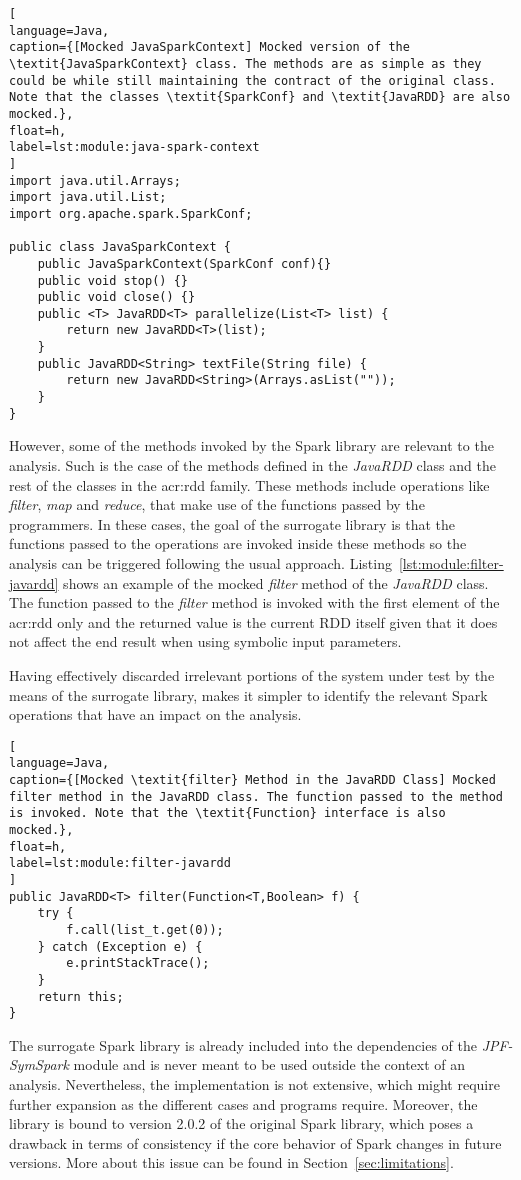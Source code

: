 \begin{lstlisting}[
language=Java,
caption={[Mocked JavaSparkContext] Mocked version of the \textit{JavaSparkContext} class. The methods are as simple as they could be while still maintaining the contract of the original class. Note that the classes \textit{SparkConf} and \textit{JavaRDD} are also mocked.},
float=h,
label=lst:module:java-spark-context
]
import java.util.Arrays;
import java.util.List;
import org.apache.spark.SparkConf;

public class JavaSparkContext {	
	public JavaSparkContext(SparkConf conf){}
	public void stop() {}	
	public void close() {}
	public <T> JavaRDD<T> parallelize(List<T> list) {		
		return new JavaRDD<T>(list);
	}
	public JavaRDD<String> textFile(String file) {
		return new JavaRDD<String>(Arrays.asList(""));
	}
}
\end{lstlisting}

However, some of the methods invoked by the Spark library are relevant to the analysis. Such is the case of the methods defined in the \textit{JavaRDD} class and the rest of the classes in the \acrshort{acr:rdd} family. These methods include operations like \textit{filter}, \textit{map} and \textit{reduce}, that make use of the functions passed by the programmers. In these cases, the goal of the surrogate library is that the functions passed to the operations are invoked inside these methods so the analysis can be triggered following the usual \spf{} approach. Listing~\ref{lst:module:filter-javardd} shows an example of the mocked \textit{filter} method of the \textit{JavaRDD} class. The function passed to the \textit{filter} method is invoked with the first element of the \acrshort{acr:rdd} only and the returned value is the current RDD itself given that it does not affect the end result when using symbolic input parameters.

Having effectively discarded irrelevant portions of the system under test by the means of the surrogate library, makes it simpler to identify the relevant Spark operations that have an impact on the analysis.

\begin{lstlisting}[
language=Java,
caption={[Mocked \textit{filter} Method in the JavaRDD Class] Mocked filter method in the JavaRDD class. The function passed to the method is invoked. Note that the \textit{Function} interface is also mocked.},
float=h,
label=lst:module:filter-javardd
]
public JavaRDD<T> filter(Function<T,Boolean> f) {		
	try {
		f.call(list_t.get(0));
	} catch (Exception e) {
		e.printStackTrace();
	}
	return this;
}
\end{lstlisting}

The surrogate Spark library is already included into the dependencies of the \textit{JPF-SymSpark} module and is never meant to be used outside the context of an analysis. Nevertheless, the implementation is not extensive, which might require further expansion as the different cases and programs require. Moreover, the library is bound to version 2.0.2 of the original Spark library, which poses a drawback in terms of consistency if the core behavior of Spark changes in future versions. More about this issue can be found in Section~\ref{sec:limitations}.